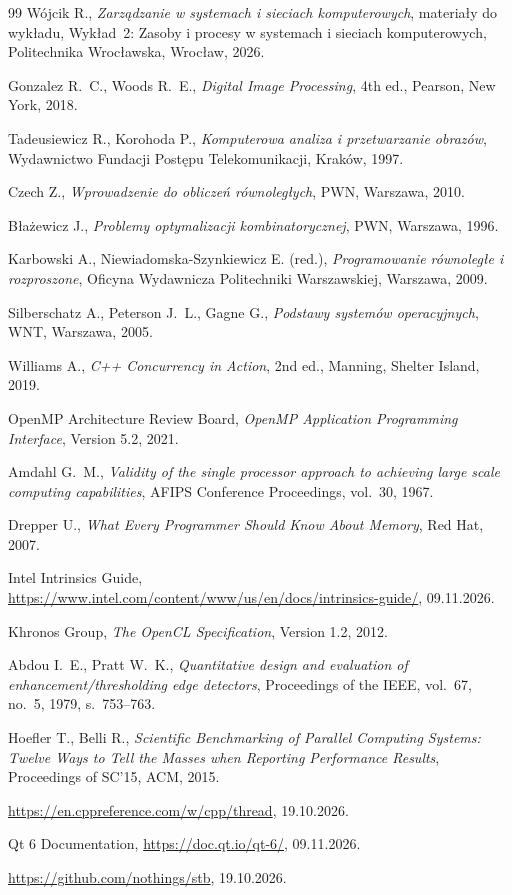 \documentclass[12pt,a4paper]{article}
\begin{document}
\begin{thebibliography}{99}
	Wójcik R., \emph{Zarządzanie w systemach i sieciach komputerowych}, materiały do wykładu, Wykład~2: Zasoby i procesy w systemach i sieciach komputerowych, Politechnika Wrocławska, Wrocław, 2026.

	Gonzalez R.~C., Woods R.~E., \emph{Digital Image Processing}, 4th ed., Pearson, New York, 2018.

	Tadeusiewicz R., Korohoda P., \emph{Komputerowa analiza i przetwarzanie obrazów}, Wydawnictwo Fundacji Postępu Telekomunikacji, Kraków, 1997.

	Czech Z., \emph{Wprowadzenie do obliczeń równoległych}, PWN, Warszawa, 2010.

	Błażewicz J., \emph{Problemy optymalizacji kombinatorycznej}, PWN, Warszawa, 1996.

	Karbowski A., Niewiadomska-Szynkiewicz E. (red.), \emph{Programowanie równoległe i rozproszone}, Oficyna Wydawnicza Politechniki Warszawskiej, Warszawa, 2009.

	Silberschatz A., Peterson J.~L., Gagne G., \emph{Podstawy systemów operacyjnych}, WNT, Warszawa, 2005.

	Williams A., \emph{C++ Concurrency in Action}, 2nd ed., Manning, Shelter Island, 2019.

	OpenMP Architecture Review Board, \emph{OpenMP Application Programming Interface}, Version 5.2, 2021.

	Amdahl G.~M., \emph{Validity of the single processor approach to achieving large scale computing capabilities}, AFIPS Conference Proceedings, vol.~30, 1967.

	Drepper U., \emph{What Every Programmer Should Know About Memory}, Red Hat, 2007.

	Intel Intrinsics Guide, \url{https://www.intel.com/content/www/us/en/docs/intrinsics-guide/}, 09.11.2026.

	Khronos Group, \emph{The OpenCL Specification}, Version 1.2, 2012.

	Abdou I.~E., Pratt W.~K., \emph{Quantitative design and evaluation of enhancement/thresholding edge detectors}, Proceedings of the IEEE, vol.~67, no.~5, 1979, s.~753--763.

	Hoefler T., Belli R., \emph{Scientific Benchmarking of Parallel Computing Systems: Twelve Ways to Tell the Masses when Reporting Performance Results}, Proceedings of SC'15, ACM, 2015.

	\url{https://en.cppreference.com/w/cpp/thread}, 19.10.2026.

	Qt 6 Documentation, \url{https://doc.qt.io/qt-6/}, 09.11.2026.

	\url{https://github.com/nothings/stb}, 19.10.2026.
\end{thebibliography}
\end{document}
